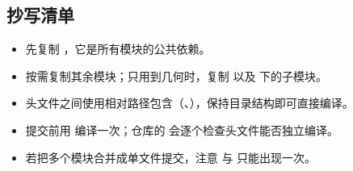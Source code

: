\subsection{抄写清单}

\begin{itemize}[leftmargin=1.6em, itemsep=0.4em]
    \item 先复制 ，它是所有模块的公共依赖。
    \item 按需复制其余模块；只用到几何时，复制  以及  下的子模块。
    \item 头文件之间使用相对路径包含（、），保持目录结构即可直接编译。
    \item 提交前用  编译一次；仓库的  会逐个检查头文件能否独立编译。
    \item 若把多个模块合并成单文件提交，注意  与  只能出现一次。
\end{itemize}

